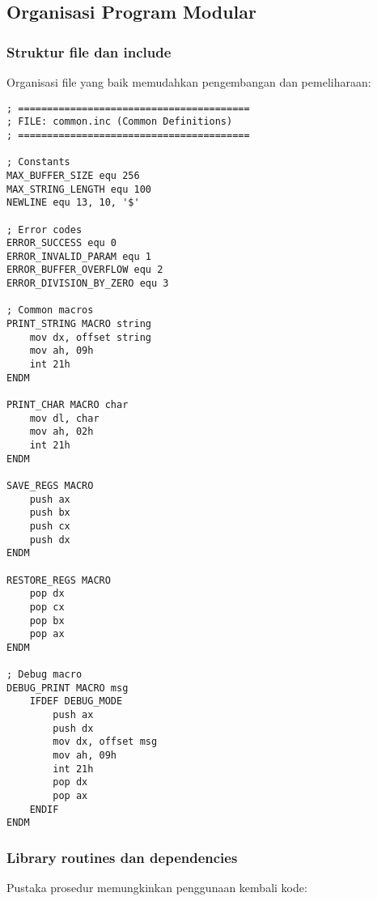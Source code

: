 \documentclass[../main.tex]{subfiles}
\begin{document}
        \subsection{Organisasi Program Modular}
            \subsubsection{Struktur file dan include}
                Organisasi file yang baik memudahkan pengembangan dan pemeliharaan:

                \begin{lstlisting}[language={[x86masm]Assembler}, caption=File: common.inc (Common Definitions), label={lst:common-include}]
; ========================================
; FILE: common.inc (Common Definitions)
; ========================================

; Constants
MAX_BUFFER_SIZE equ 256
MAX_STRING_LENGTH equ 100
NEWLINE equ 13, 10, '$'

; Error codes
ERROR_SUCCESS equ 0
ERROR_INVALID_PARAM equ 1
ERROR_BUFFER_OVERFLOW equ 2
ERROR_DIVISION_BY_ZERO equ 3

; Common macros
PRINT_STRING MACRO string
    mov dx, offset string
    mov ah, 09h
    int 21h
ENDM

PRINT_CHAR MACRO char
    mov dl, char
    mov ah, 02h
    int 21h
ENDM

SAVE_REGS MACRO
    push ax
    push bx
    push cx
    push dx
ENDM

RESTORE_REGS MACRO
    pop dx
    pop cx
    pop bx
    pop ax
ENDM

; Debug macro
DEBUG_PRINT MACRO msg
    IFDEF DEBUG_MODE
        push ax
        push dx
        mov dx, offset msg
        mov ah, 09h
        int 21h
        pop dx
        pop ax
    ENDIF
ENDM
                \end{lstlisting}

            \subsubsection{Library routines dan dependencies}
                Pustaka prosedur memungkinkan penggunaan kembali kode:
\end{document}

